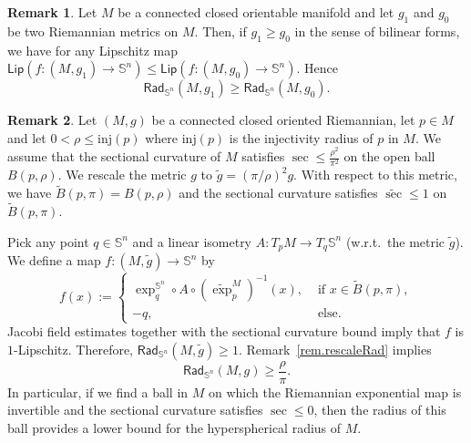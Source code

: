 \documentclass[11pt,reqno]{amsart}
\newcommand{\RadSn}{\mathsf{Rad}_{\Sn}}
\newcommand{\Lip}{\mathsf{Lip}}
\newcommand{\Sn}{\mathbb{S}^n}
\newcommand{\inj}{\mathrm{inj}}
\newcommand{\<}{\langle}
\renewcommand{\>}{\rangle}
\theoremstyle{definition}
\newtheorem{remark}{Remark}
\begin{document}
\begin{remark}
Let $M$ be a connected closed orientable manifold and let $g_1$ and $g_0$ be two Riemannian metrics on $M$.
Then, if $g_1\ge g_0$ in the sense of bilinear forms, we have for any Lipschitz map $\Lip(f\colon (M,g_1)\to \Sn)\le\Lip(f\colon (M,g_0)\to \Sn)$.
Hence 
$$
\RadSn(M,g_1)\ge\RadSn(M,g_0).
$$
\end{remark}

\begin{remark}\label{rem.injrad}
Let $(M,g)$ be a connected closed oriented Riemannian, let $p\in M$ and let $0<\rho\le\inj(p)$ where $\inj(p)$ is the injectivity radius of $p$ in $M$.
We assume that the sectional curvature of $M$ satisfies $\sec\le\frac{\rho^2}{\pi^2}$ on the open ball $B(p,\rho)$.
We rescale the metric $g$ to $\tilde{g}=(\pi/\rho)^2g$.
With respect to this metric, we have $\tilde{B}(p,\pi)=B(p,\rho)$ and the sectional curvature satisfies $\widetilde{\sec}\le 1$ on $\tilde{B}(p,\pi)$.

Pick any point $q\in\Sn$ and a linear isometry $A\colon T_pM\to T_q\Sn$ (w.r.t.\ the metric $\tilde{g}$).
We define a map $f\colon (M,\tilde{g})\to \Sn$ by
\begin{equation*}
f(x):=
\begin{cases}
\exp_q^{\Sn}\circ A\circ (\widetilde{\exp}_p^{M})^{-1}(x), & \text{ if }x\in \tilde{B}(p,\pi),\\
-q, & \text{ else}.
\end{cases}
\end{equation*}
Jacobi field estimates together with the sectional curvature bound imply that $f$ is $1$-Lipschitz.
Therefore, $\RadSn(M,\tilde{g})\ge1$.
Remark~\ref{rem.rescaleRad} implies 
\begin{equation}
\RadSn(M,g) \ge \frac{\rho}{\pi} .
\label{eq.RadSninjrad}
\end{equation}
In particular, if we find a ball in $M$ on which the Riemannian exponential map is invertible and the sectional curvature satisfies $\sec\le0$, then the radius of this ball provides a lower bound for the hyperspherical radius of $M$.
\end{remark}


\end{document}
